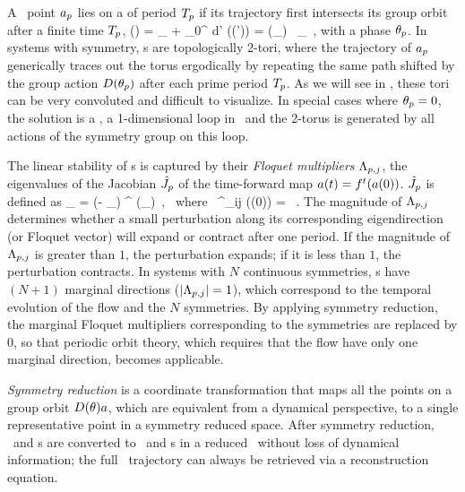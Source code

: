 A \statesp\ point $a_{p}$ lies on a \emph{\rpo} of period
${T_{p}}$ if its trajectory first intersects its group orbit after
a finite time ${T_{p}}$,
\beq
\ssp(\period{\rpprime})
    = \ssp_\rpprime
     + \int_0^\period{\rpprime} \!\!\!\!d\tau' \vel(\ssp (\tau'))
    = \matrixRep(\theta_\rpprime) \,  \ssp_\rpprime
  \,,
with a phase $\theta_{p}$. In systems with  symmetry,
\rpo s are topologically 2-tori, where the trajectory of
$a_{p}$ generically traces out the torus ergodically by
repeating the same path shifted by the group action
${D}(\theta_{p})$ after each prime period
${T_{p}}$. As we will see in , these tori
can be very convoluted and difficult to visualize. In special cases where
$\theta_{p}=0$, the solution is a \po, a 1-dimensional loop in \statesp\ and
the 2-torus is generated by all actions of the symmetry group on this
loop.

The linear stability of \rpo s is captured by their \emph{Floquet
multipliers}  $\Lambda_{p,j}$, the eigenvalues of the Jacobian $\hat{{J}}_{p}$
of the  time-forward map $a(t)={f^{t}(a(0))}$. $\hat{{J}}_{p}$ is defined as
\beq
\jMpsRed_{\rpprime}
= \matrixRep(- \theta_\rpprime ) \jMps^\period{\rpprime} (\ssp_\rpprime)
\,, \; \mbox{~where~}\;
\jMps^{\zeit}_{ij} (\ssp(0)) = \, .
The magnitude of $\Lambda_{p,j}$ determines whether a small perturbation
along its corresponding eigendirection (or Floquet vector) will expand or
contract after one period. If the magnitude of $\Lambda_{p,j}$ is
greater than $1$, the perturbation expands; if it is less than $1$, the
perturbation contracts. In systems with $N$ continuous symmetries, \rpo s
have $(N+1)$ marginal directions ($\left|\Lambda_{p,j}\right| = 1$),
which correspond to the temporal evolution of the flow and the $N$
symmetries. By applying symmetry reduction, the marginal Floquet
multipliers corresponding to the symmetries are replaced by $0$, so that
periodic orbit theory, which requires that the flow have only one
marginal direction, becomes applicable.

\emph{Symmetry reduction} is a coordinate transformation that maps
all the points on a group orbit ${D}(\theta) a$, which are
equivalent from a dynamical perspective, to a single representative point
in a symmetry reduced space. After symmetry reduction, \reqva\ and \rpo s
are converted to \eqva\ and \po s in a
reduced \statesp\ without loss of dynamical information; the full \statesp\
trajectory can always be retrieved via a reconstruction equation.

